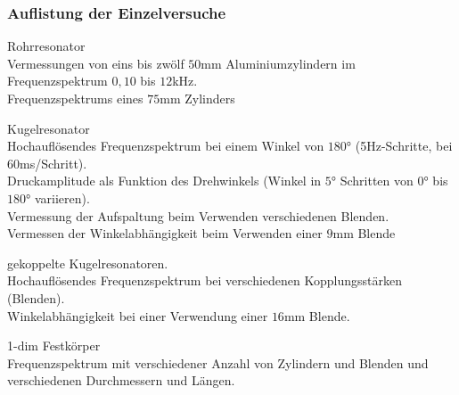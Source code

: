 \subsubsection*{Auflistung der Einzelversuche}
\begin{description}
    \item Rohrresonator\\
    Vermessungen von eins bis zwölf $50$mm Aluminiumzylindern im Frequenzspektrum $0,10$ bis $12$kHz.\\
    Frequenzspektrums eines $75$mm Zylinders
    \item Kugelresonator\\
    Hochauflösendes Frequenzspektrum bei einem Winkel von $180°$ (5Hz-Schritte, bei 60ms/Schritt).\\
    Druckamplitude als Funktion des Drehwinkels (Winkel in $5°$ Schritten von $0°$ bis $180°$ variieren).\\
    Vermessung der Aufspaltung beim Verwenden verschiedenen Blenden.\\
    Vermessen der Winkelabhängigkeit beim Verwenden einer $9$mm Blende
    \item gekoppelte Kugelresonatoren.\\
    Hochauflösendes Frequenzspektrum bei verschiedenen Kopplungsstärken (Blenden).\\
    Winkelabhängigkeit bei einer Verwendung einer $16$mm Blende.\\
    \item 1-dim Festkörper\\
    Frequenzspektrum mit verschiedener Anzahl von Zylindern und Blenden und verschiedenen Durchmessern und Längen.\\
\end{description}

\label{sec:Durchfuehrung}
